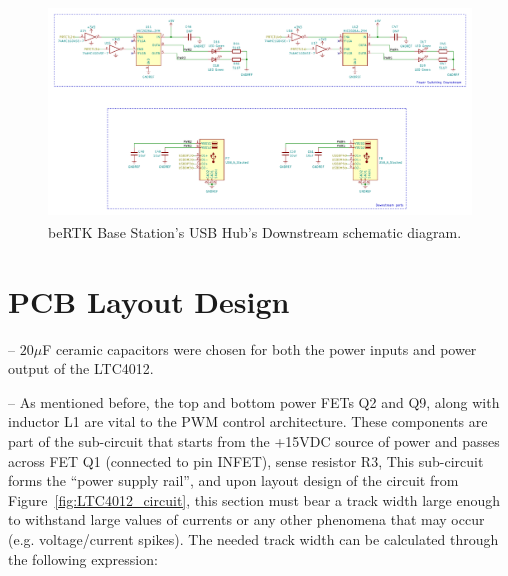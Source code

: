 \begin{figure}[h]
	\centering
	\includegraphics[width=1.0\textwidth]{Chapters/Figures/chapter3/USB_Hub_Downstream.pdf}
	\caption{beRTK\textsuperscript{\textregistered} Base Station's USB Hub's Downstream schematic diagram.}
	\label{fig:USB_Hub_Downstream_circuit}
\end{figure}



\section{PCB Layout Design}\label{sec:33_PCBlayout}

-- $20 \mu$F ceramic capacitors were chosen for both the power inputs and power output of the LTC4012. 

-- As mentioned before, the top and bottom power FETs Q2 and Q9, along with inductor L1 are vital to the PWM control architecture. These components are part of the sub-circuit that starts from the +15VDC source of power and passes across FET Q1 (connected to pin INFET), sense resistor R3, 
This sub-circuit forms the ``power supply rail'', and upon layout design of the circuit from Figure~\ref{fig:LTC4012_circuit}, this section must bear a track width large enough to withstand large values of currents or any other phenomena that may occur (e.g. voltage/current spikes). The needed track width can be calculated through the following expression: